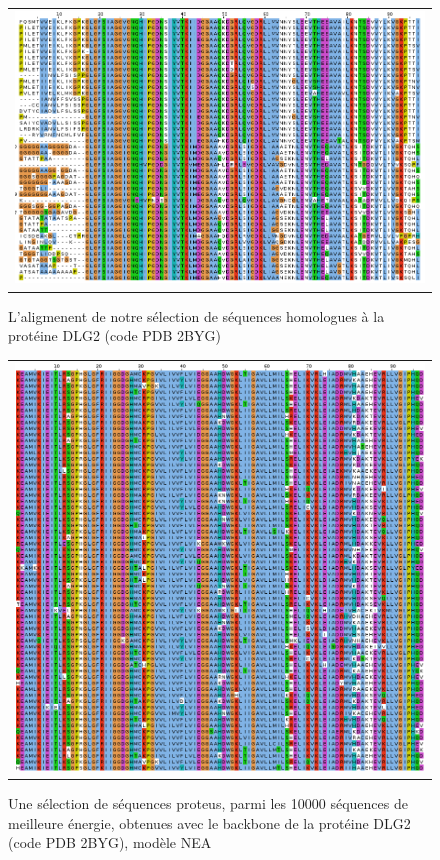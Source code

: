    \begin{figure}[t]
     \centering
     \begin{tabular}{c}
       \includegraphics[width=17cm]{homologues/2BYG.png} \\
     \end{tabular}
     \caption{L'aligmenent de notre sélection de séquences homologues à la protéine DLG2 (code PDB 2BYG)}
\label{align_homo:DLG2}
   \end{figure}

   \begin{figure}[t]
     \centering
     \begin{tabular}{c}
       \includegraphics[width=17cm]{proteus/2BYG.png} \\
     \end{tabular}
       \caption{Une sélection de séquences proteus, parmi les 10000 séquences de meilleure énergie, obtenues avec le backbone de la protéine DLG2 (code PDB 2BYG), modèle NEA}
\label{align_proteus:DLG2}
   \end{figure}
\clearpage

